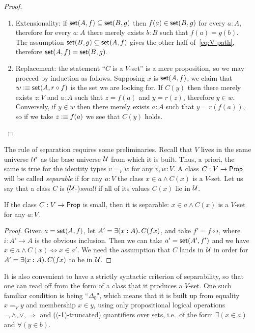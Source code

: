 \begin{proof}
  \mbox{}
  \begin{enumerate}
  \item Extensionality: if $\mathsf{set}(A,f) \subseteq \mathsf{set}(B, g)$ then $f(a) \in \mathsf{set}(B, g)$
    for every $a : A$, therefore for every $a : A$ there merely exists $b : B$ such that
    $f(a) = g(b)$. The assumption $\mathsf{set}(B, g) \subseteq \mathsf{set}(A, f)$ gives the other half
    of~\eqref{eq:V-path}, therefore $\mathsf{set}(A,f) = \mathsf{set}(B,g)$.

  \item Replacement: the statement ``$C$ is a $V$-set'' is a mere proposition, so we may
    proceed by induction as follows. Supposing $x$ is $\mathsf{set}(A, f)$, we claim that $w
    \vcentcolon\equiv \mathsf{set}(A, r \circ f)$ is the set we are looking for.  If $C(y)$ then there merely exists
    $z : V$ and $a : A$ such that $z = f(a)$ and $y = r(z)$, therefore $y \in w$.
    Conversely, if $y \in w$ then there merely exists $a : A$ such that $y = r(f(a))$, so
    if we take $z \vcentcolon\equiv f(a)$ we see that $C(y)$ holds.
  \end{enumerate}
\end{proof}

The rule of separation requires some preliminaries.  Recall that $V$ lives in the same universe $\mathcal{U}'$ as the base universe $\mathcal{U}$ from which it is built. Thus, a priori, the same is true for the identity types $v=_V w$ for any $v,w:V$.  A class $C: V\to \mathsf{Prop}$ will be called \emph{separable} if for any $a:V$ the class $x\in a \wedge C(x)$ is a $V$-set.  Let us say that a class $C$ is ($\mathcal{U}$-)\emph{small} if all of its values $C(x)$ lie in $\mathcal{U}$.

\begin{lem}\label{lem:sep}
If the class $C: V \to \mathsf{Prop}$ is small, then it is separable:  $x\in a \wedge C(x)$ is a $V$-set for any $a:V$.
\end{lem}

\begin{proof}
Given $a=\mathsf{set}(A,f)$, let $A' = \exis{x:A}C(fx)$, and take $f' = f\circ i$, where $i : A' \to A$ is the obvious inclusion.  Then we can take $a' = \mathsf{set}(A',f')$ and we have $x\in a\wedge C(x) \Leftrightarrow x\in a'$.  We need the assumption that $C$ lands in $\mathcal{U}$ in order for $A' = \exis{x:A}C(fx)$ to be in $\mathcal{U}$.
\end{proof}

It is also convenient to have a strictly syntactic criterion of separability, so that one can read off from the form of a class that it produces a $V$-set.  One such familiar condition is being ``$\Delta_0$", which means that it is built up from equality $x=_V y$ and membership $x\in y$, using only propositional logical operations $\neg, \land, \lor, \Rightarrow$ and ((-1)-truncated) quantifiers over sets, i.e.\ of the form $\exists(x\in a)$ and $\forall(y\in b)$.  

